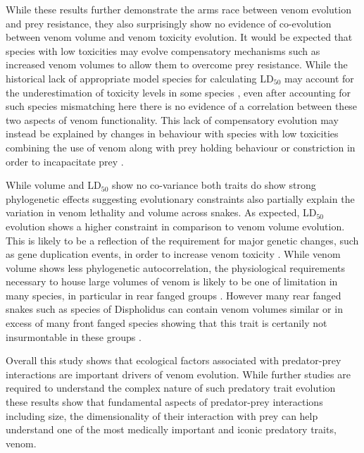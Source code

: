 While these results further demonstrate the arms race between venom evolution and prey resistance, they also surprisingly show no evidence of co-evolution between venom volume and venom toxicity evolution. It would be expected that species with low toxicities may evolve compensatory mechanisms such as increased venom volumes to allow them to overcome prey resistance. While the historical lack of appropriate model species for calculating LD$_{50}$ may account for the underestimation of toxicity levels in some species \citep{da2001prey}, even after accounting for such species mismatching here there is no evidence of a correlation between these two aspects of venom functionality. This lack of compensatory evolution may instead be explained by changes in behaviour with species with low toxicities combining the use of venom along with prey holding behaviour or constriction in order to incapacitate prey \citep{shine1985prey}.


While volume and LD$_{50}$ show no co-variance both traits do show strong phylogenetic effects suggesting evolutionary constraints also partially explain the variation in venom lethality and volume across snakes. As expected, LD$_{50}$ evolution shows a higher constraint in comparison to venom volume evolution. This is likely to be a reflection of the requirement for major genetic changes, such as gene duplication events, in order to increase venom toxicity \citep{vonk2013king}. While venom volume shows less phylogenetic autocorrelation, the physiological requirements necessary to house large volumes of venom is likely to be one of limitation in many species, in particular in rear fanged groups \citep{kardong1982evolution}. However many rear fanged snakes such as species of Dispholidus can contain venom volumes similar or in excess of many front fanged species showing that this trait is certanily not insurmontable in these groups \citep{kochva1980venom,fry2008evolution}.


Overall this study shows that ecological factors associated with predator-prey interactions are important drivers of venom evolution. While further studies are required to understand the complex nature of such predatory trait evolution these results show that fundamental aspects of predator-prey interactions including size, the dimensionality of their interaction with prey can help understand one of the most medically important and iconic predatory traits, venom.



%
%

